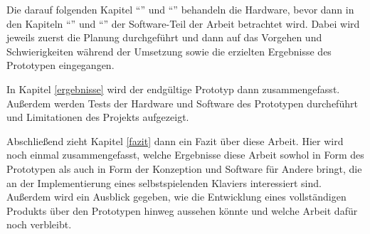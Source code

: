 Die darauf folgenden Kapitel \enquote{} und \enquote{} behandeln die Hardware, bevor dann in den Kapiteln \enquote{} und \enquote{} der Software-Teil der Arbeit betrachtet wird.
Dabei wird jeweils zuerst die Planung durchgeführt und dann auf das Vorgehen und Schwierigkeiten während der Umsetzung sowie die erzielten Ergebnisse des Prototypen eingegangen.

In Kapitel \ref{ergebnisse} wird der endgültige Prototyp dann zusammengefasst.
Außerdem werden Tests der Hardware und Software des Prototypen durcheführt und Limitationen des Projekts aufgezeigt.

Abschließend zieht Kapitel \ref{fazit} dann ein Fazit über diese Arbeit.
Hier wird noch einmal zusammengefasst, welche Ergebnisse diese Arbeit sowhol in Form des Prototypen als auch in Form der Konzeption und Software für Andere bringt, die an der Implementierung eines selbstspielenden Klaviers interessiert sind.
Außerdem wird ein Ausblick gegeben, wie die Entwicklung eines vollständigen Produkts über den Prototypen hinweg aussehen könnte und welche Arbeit dafür noch verbleibt.
